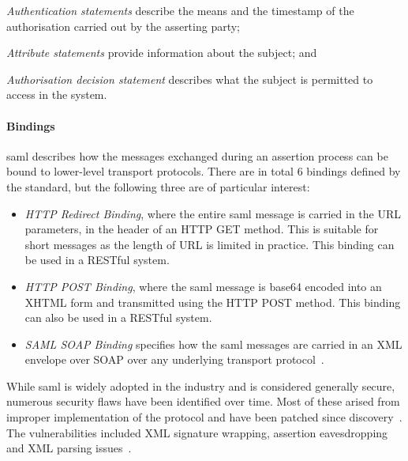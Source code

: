 \begin{enumerate*}[label=(\roman*)]
    \item \textit{Authentication statements} describe the means and the timestamp of the authorisation carried out by the asserting party;
    \item \textit{Attribute statements} provide information about the subject; and
    \item \textit{Authorisation decision statement} describes what the subject is permitted to access in the system.
\end{enumerate*}


\paragraph{Bindings}
\acrshort{saml} describes how the messages exchanged during an assertion process can be bound to lower-level transport protocols. There are in total 6 bindings defined by the standard, but the following three are of particular interest:

\begin{itemize}[noitemsep]
    \item \textit{HTTP Redirect Binding}, where the entire \acrshort{saml} message is carried in the URL parameters, in the header of an HTTP GET method. This is suitable for short messages as the length of URL is limited in practice. This binding can be used in a RESTful system.
    \item \textit{HTTP POST Binding}, where the \acrshort{saml} message is base64 encoded into an XHTML form and transmitted using the HTTP POST method. This binding can also be used in a RESTful system.
    \item \textit{SAML SOAP Binding} specifies how the \acrshort{saml} messages are carried in an XML envelope over SOAP over any underlying transport protocol~\cite{Cantor2005BindingsV2.0}.
\end{itemize}


While \acrshort{saml} is widely adopted in the industry and is considered generally secure, numerous security flaws have been identified over time. Most of these arised from improper implementation of the protocol and have been patched since discovery~\cite{Krawczyk2014SecureAttacks}. The vulnerabilities included XML signature wrapping, assertion eavesdropping~\cite{Chen2014Environment-BoundAssertions} and XML parsing issues~\cite{Degges2018AVulnerability}.